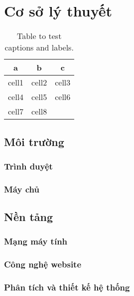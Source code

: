 \chapter{Cơ sở lý thuyết}


\blindtext

\begin{table}[h!]
	\begin{center}
	\begin{tabular}{ |c|c|c| } 
		\hline
		a & b & c \\
		\hline
		cell1 & cell2 & cell3 \\ 
		cell4 & cell5 & cell6 \\ 
		cell7 & cell8 & \dotfill \\ 
		\hline
	\end{tabular}
		\caption{Table to test captions and labels.}
		\label{table:1}
	\end{center}
\end{table}

\section{Môi trường}

\subsection{Trình duyệt}
\blindtext

\subsection{Máy chủ}
\blindtext


\section{Nền tảng}
\subsection{Mạng máy tính}
\blindtext
\subsection{Công nghệ website}
\blindtext
\subsection{Phân tích và thiết kế hệ thống}
\blindtext
